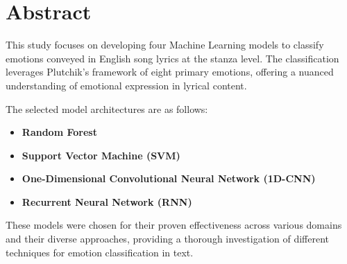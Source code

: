\chapter*{Abstract}


This study focuses on developing four Machine Learning models to classify
emotions conveyed in English song lyrics at the stanza level. The
classification leverages Plutchik's framework of eight primary emotions,
offering a nuanced understanding of emotional expression in lyrical content.

The selected model architectures are as follows:
\begin{itemize}
    \item \textbf{Random Forest}
    \item \textbf{Support Vector Machine (SVM)}
    \item \textbf{One-Dimensional Convolutional Neural Network (1D-CNN)}
    \item \textbf{Recurrent Neural Network (RNN)}
\end{itemize}

These models were chosen for their proven effectiveness across various
domains and their diverse approaches, providing a thorough
investigation of different techniques for emotion classification in text.\\
